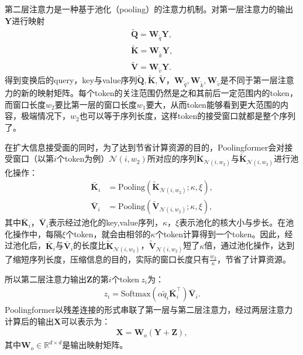 第二层注意力是一种基于池化（pooling）的注意力机制。对第一层注意力的输出$\mathbf{Y}$进行映射
\begin{align}
\mathbf{\widetilde{Q}}=\mathbf{W}_{\widetilde{q}}\mathbf{Y},\\
\mathbf{\widetilde{K}}=\mathbf{W}_{\widetilde{k}}\mathbf{Y},\\
\mathbf{\widetilde{V}}=\mathbf{W}_{\widetilde{v}}\mathbf{Y}.
\label{eq:second_att_input}
\end{align}
得到变换后的query，key与value序列$\mathbf{\widetilde{Q}},\mathbf{\widetilde{K}},\mathbf{\widetilde{V}}$，$\mathbf{W}_{\widetilde{q}},\mathbf{W}_{\widetilde{k}},\mathbf{W}_{\widetilde{v}}$是不同于第一层注意力的新的映射矩阵。每个token的关注范围仍然是之和其前后一定范围内的token，而窗口长度$w_2$要比第一层的窗口长度$w_1$要大，从而token能够看到更大范围的内容，极端情况下，$w_2$也可以等于序列长度，这样token的接受窗口就都是整个序列了。

在扩大信息接受面的同时，为了达到节省计算资源的目的，Poolingformer会对接受窗口（以第$i$个token为例）$\mathcal{N}(i, w_2)$所对应的序列$\widetilde{\mathbf{{K}}}_{\mathcal{N}(i, w_2)}$与$\widetilde{\mathbf{{K}}}_{\mathcal{N}(i, w_2)}$进行池化操作：
\begin{align}
    \bar{\mathbf{K}}_i &= \text{Pooling}( \widetilde{\mathbf{{K}}}_{\mathcal{N}(i, w_2)}; \kappa, \xi), \\
    \bar{\mathbf{V}}_i &= \text{Pooling}( \widetilde{\mathbf{{V}}}_{\mathcal{N}(i, w_2)}; \kappa, \xi),
\label{eq:pool}
\end{align}
其中$\bar{\mathbf{K}}_i$，$\bar{\mathbf{V}}_i$表示经过池化的key,value序列，$\kappa$，$\xi$表示池化的核大小与步长。在池化操作中，每隔$\xi$个token，就会由相邻的$\kappa$个token计算得到一个token。因此，经过池化后，$\bar{\mathbf{K}}_i$与$\bar{\mathbf{V}}_i$的长度比$\widetilde{\mathbf{{K}}}_{\mathcal{N}(i, w_2)}$，$\widetilde{\mathbf{{V}}}_{\mathcal{N}(i, w_2)}$短了$\kappa$倍，通过池化操作，达到了缩短序列长度，压缩信息的目的，实际的窗口长度只有$\frac{w_2}{\kappa}$，节省了计算资源。

所以第二层注意力输出$\mathbf{Z}$的第$i$个token$\ z_i$为：
\begin{align}
z_i = \text{Softmax}\left( \alpha \widetilde{q}_i \bar{\mathbf{K}}_{i}^\top \right) \bar{\mathbf{V}}_{i}.
\label{eq:second_att}
\end{align}
Poolingformer以残差连接的形式串联了第一层与第二层注意力，经过两层注意力计算后的输出$\mathbf{X}$可以表示为：
\begin{align}
\mathbf{X} = \mathbf{W}_o(\mathbf{Y}+\mathbf{Z}),
\label{eq:second_att_out}
\end{align}
其中$\mathbf{W}_o \in \mathbb{R}^{d \times d}$是输出映射矩阵。

